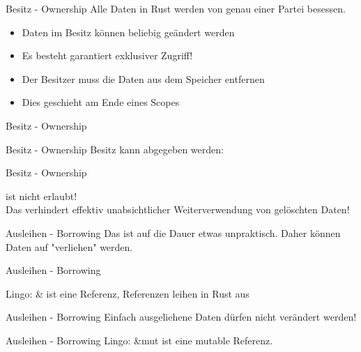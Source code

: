 \documentclass{beamer}
\begin{document}
\begin{frame}{Besitz - Ownership}
	Alle Daten in Rust werden von genau einer Partei besessen.

	\begin{itemize}
		\item Daten im Besitz können beliebig geändert werden
		\item Es besteht garantiert exklusiver Zugriff!
		\item Der Besitzer muss die Daten aus dem Speicher entfernen
		\item Dies geschieht am Ende eines Scopes
	\end{itemize}
\end{frame}

\begin{frame}{Besitz - Ownership}
\end{frame}

\begin{frame}{Besitz - Ownership}
	Besitz kann abgegeben werden:

\end{frame}

\begin{frame}{Besitz - Ownership}
	

	 ist nicht erlaubt!\\

	Das verhindert effektiv unabsichtlicher Weiterverwendung von gelöschten Daten!
\end{frame}

\begin{frame}{Ausleihen - Borrowing}
	Das ist auf die Dauer etwas unpraktisch. Daher können Daten auf "verliehen" werden.
\end{frame}

\begin{frame}{Ausleihen - Borrowing}

	Lingo: \& ist eine Referenz, Referenzen leihen in Rust aus
\end{frame}

\begin{frame}{Ausleihen - Borrowing}
	Einfach ausgeliehene Daten dürfen nicht verändert werden!
\end{frame}

\begin{frame}{Ausleihen - Borrowing}
	Lingo: \&mut ist eine mutable Referenz.
\end{frame}
\end{document}
